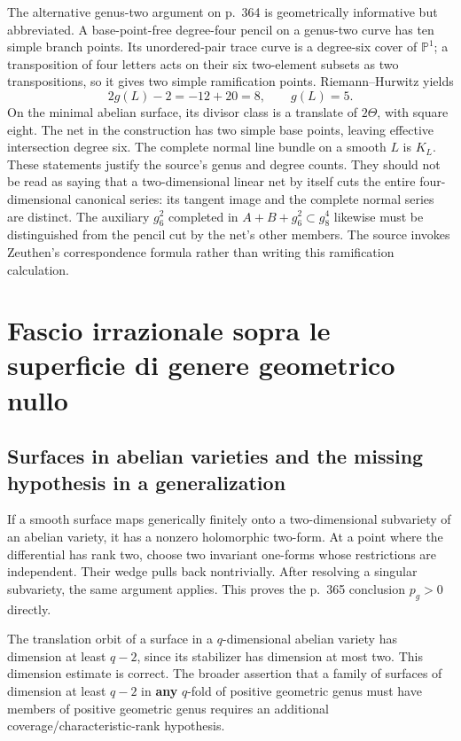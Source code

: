 The alternative genus-two argument on p.~364 is geometrically informative but abbreviated. A base-point-free degree-four pencil on a genus-two curve has ten simple branch points. Its unordered-pair trace curve is a degree-six cover of \(\mathbb P^1\); a transposition of four letters acts on their six two-element subsets as two transpositions, so it gives two simple ramification points. Riemann--Hurwitz yields
\[
2g(L)-2=-12+20=8,\qquad g(L)=5.
\]
On the minimal abelian surface, its divisor class is a translate of \(2\Theta\), with square eight. The net in the construction has two simple base points, leaving effective intersection degree six. The complete normal line bundle on a smooth \(L\) is \(K_L\). These statements justify the source's genus and degree counts. They should not be read as saying that a two-dimensional linear net by itself cuts the entire four-dimensional canonical series: its tangent image and the complete normal series are distinct. The auxiliary \(g^2_6\) completed in \(A+B+g^2_6\subset g^4_8\) likewise must be distinguished from the pencil cut by the net's other members. The source invokes Zeuthen's correspondence formula rather than writing this ramification calculation.



\section{Fascio irrazionale sopra le superficie di genere geometrico nullo}\label{cp2-ix-11}

\subsection{Surfaces in abelian varieties and the missing hypothesis in a generalization}\label{cp2-ix-11-1}

If a smooth surface maps generically finitely onto a two-dimensional subvariety of an abelian variety, it has a nonzero holomorphic two-form. At a point where the differential has rank two, choose two invariant one-forms whose restrictions are independent. Their wedge pulls back nontrivially. After resolving a singular subvariety, the same argument applies. This proves the p.~365 conclusion \(p_g>0\) directly.

The translation orbit of a surface in a \(q\)-dimensional abelian variety has dimension at least \(q-2\), since its stabilizer has dimension at most two. This dimension estimate is correct. The broader assertion that a family of surfaces of dimension at least \(q-2\) in \textbf{any} \(q\)-fold of positive geometric genus must have members of positive geometric genus requires an additional coverage/characteristic-rank hypothesis.

